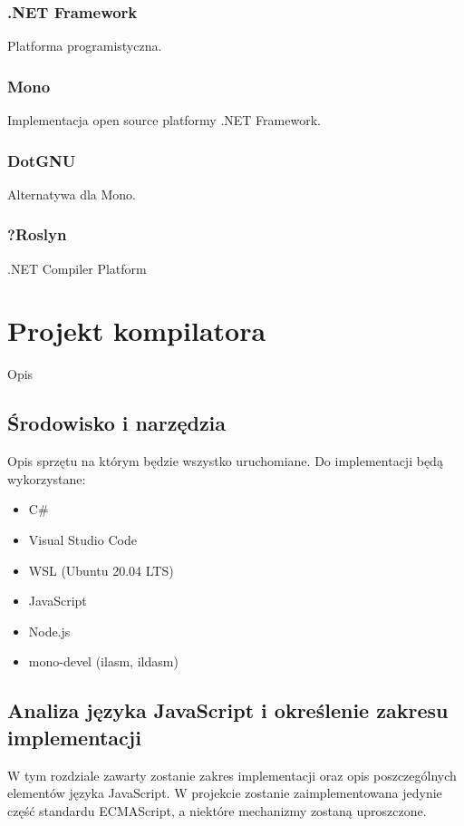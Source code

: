 \documentclass[a4paper]{article}
\begin{document}
\subsubsection{.NET Framework}
Platforma programistyczna.

\subsubsection{Mono}
Implementacja open source platformy .NET Framework.

\subsubsection{DotGNU}
Alternatywa dla Mono.

\subsubsection{?Roslyn}
.NET Compiler Platform


\section{Projekt kompilatora}
Opis 
\subsection{Środowisko i narzędzia}
Opis sprzętu na którym będzie wszystko uruchomiane.
Do implementacji będą wykorzystane:

\begin{itemize}
  \item C\#
  \item Visual Studio Code
  \item WSL (Ubuntu 20.04 LTS)
  \item JavaScript
  \item Node.js
  \item mono-devel (ilasm, ildasm)
\end{itemize}

\subsection{Analiza języka JavaScript i określenie zakresu implementacji}

\par W tym rozdziale zawarty zostanie zakres implementacji oraz opis poszczególnych elementów języka JavaScript. W projekcie zostanie zaimplementowana jedynie część standardu ECMAScript, a niektóre mechanizmy zostaną uproszczone.
\end{document}
